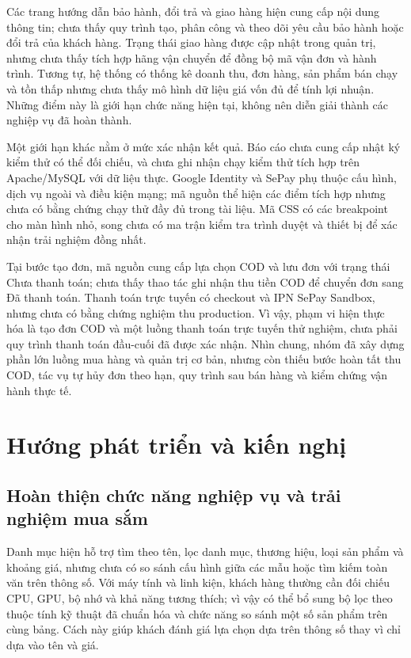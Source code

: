 Các trang hướng dẫn bảo hành, đổi trả và giao hàng hiện cung cấp nội dung thông tin; chưa thấy quy trình tạo, phân công và theo dõi yêu cầu bảo hành hoặc đổi trả của khách hàng. Trạng thái giao hàng được cập nhật trong quản trị, nhưng chưa thấy tích hợp hãng vận chuyển để đồng bộ mã vận đơn và hành trình. Tương tự, hệ thống có thống kê doanh thu, đơn hàng, sản phẩm bán chạy và tồn thấp nhưng chưa thấy mô hình dữ liệu giá vốn đủ để tính lợi nhuận. Những điểm này là giới hạn chức năng hiện tại, không nên diễn giải thành các nghiệp vụ đã hoàn thành.

Một giới hạn khác nằm ở mức xác nhận kết quả. Báo cáo chưa cung cấp nhật ký kiểm thử có thể đối chiếu, và chưa ghi nhận chạy kiểm thử tích hợp trên Apache/MySQL với dữ liệu thực. Google Identity và SePay phụ thuộc cấu hình, dịch vụ ngoài và điều kiện mạng; mã nguồn thể hiện các điểm tích hợp nhưng chưa có bằng chứng chạy thử đầy đủ trong tài liệu. Mã CSS có các breakpoint cho màn hình nhỏ, song chưa có ma trận kiểm tra trình duyệt và thiết bị để xác nhận trải nghiệm đồng nhất.

Tại bước tạo đơn, mã nguồn cung cấp lựa chọn COD và lưu đơn với trạng thái Chưa thanh toán; chưa thấy thao tác ghi nhận thu tiền COD để chuyển đơn sang Đã thanh toán. Thanh toán trực tuyến có checkout và IPN SePay Sandbox, nhưng chưa có bằng chứng nghiệm thu production. Vì vậy, phạm vi hiện thực hóa là tạo đơn COD và một luồng thanh toán trực tuyến thử nghiệm, chưa phải quy trình thanh toán đầu-cuối đã được xác nhận. Nhìn chung, nhóm đã xây dựng phần lớn luồng mua hàng và quản trị cơ bản, nhưng còn thiếu bước hoàn tất thu COD, tác vụ tự hủy đơn theo hạn, quy trình sau bán hàng và kiểm chứng vận hành thực tế.

\section{Hướng phát triển và kiến nghị}

\subsection{Hoàn thiện chức năng nghiệp vụ và trải nghiệm mua sắm}

Danh mục hiện hỗ trợ tìm theo tên, lọc danh mục, thương hiệu, loại sản phẩm và khoảng giá, nhưng chưa có so sánh cấu hình giữa các mẫu hoặc tìm kiếm toàn văn trên thông số. Với máy tính và linh kiện, khách hàng thường cần đối chiếu CPU, GPU, bộ nhớ và khả năng tương thích; vì vậy có thể bổ sung bộ lọc theo thuộc tính kỹ thuật đã chuẩn hóa và chức năng so sánh một số sản phẩm trên cùng bảng. Cách này giúp khách đánh giá lựa chọn dựa trên thông số thay vì chỉ dựa vào tên và giá.

